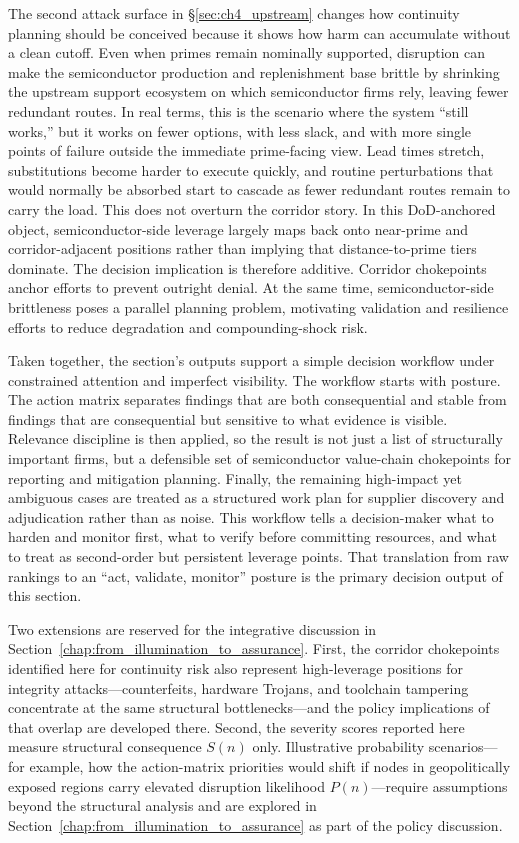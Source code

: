 The second attack surface in \S\ref{sec:ch4_upstream} changes how continuity planning should be conceived because it shows how harm can accumulate without a clean cutoff. Even when primes remain nominally supported, disruption can make the semiconductor production and replenishment base brittle by shrinking the upstream support ecosystem on which semiconductor firms rely, leaving fewer redundant routes. In real terms, this is the scenario where the system ``still works,'' but it works on fewer options, with less slack, and with more single points of failure outside the immediate prime-facing view. Lead times stretch, substitutions become harder to execute quickly, and routine perturbations that would normally be absorbed start to cascade as fewer redundant routes remain to carry the load. This does not overturn the corridor story. In this DoD-anchored object, semiconductor-side leverage largely maps back onto near-prime and corridor-adjacent positions rather than implying that distance-to-prime tiers dominate. The decision implication is therefore additive. Corridor chokepoints anchor efforts to prevent outright denial. At the same time, semiconductor-side brittleness poses a parallel planning problem, motivating validation and resilience efforts to reduce degradation and compounding-shock risk.

Taken together, the section's outputs support a simple decision workflow under constrained attention and imperfect visibility. The workflow starts with posture. The action matrix separates findings that are both consequential and stable from findings that are consequential but sensitive to what evidence is visible. Relevance discipline is then applied, so the result is not just a list of structurally important firms, but a defensible set of semiconductor value-chain chokepoints for reporting and mitigation planning. Finally, the remaining high-impact yet ambiguous cases are treated as a structured work plan for supplier discovery and adjudication rather than as noise. This workflow tells a decision-maker what to harden and monitor first, what to verify before committing resources, and what to treat as second-order but persistent leverage points. That translation from raw rankings to an ``act, validate, monitor'' posture is the primary decision output of this section.

Two extensions are reserved for the integrative discussion in Section~\ref{chap:from_illumination_to_assurance}. First, the corridor chokepoints identified here for continuity risk also represent high-leverage positions for integrity attacks---counterfeits, hardware Trojans, and toolchain tampering concentrate at the same structural bottlenecks---and the policy implications of that overlap are developed there. Second, the severity scores reported here measure structural consequence $S(n)$ only. Illustrative probability scenarios---for example, how the action-matrix priorities would shift if nodes in geopolitically exposed regions carry elevated disruption likelihood $P(n)$---require assumptions beyond the structural analysis and are explored in Section~\ref{chap:from_illumination_to_assurance} as part of the policy discussion.

